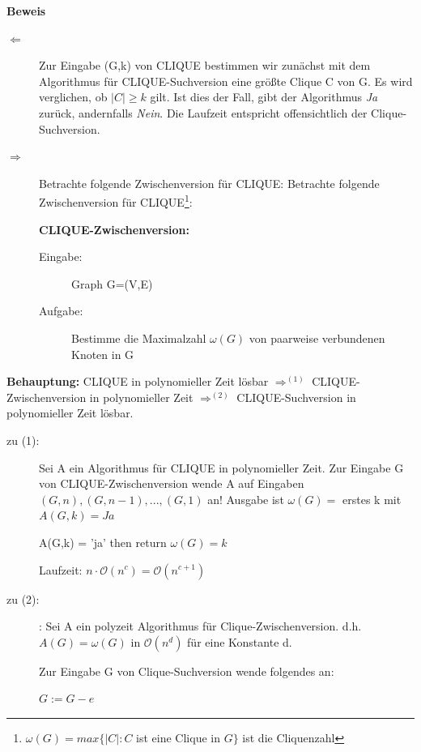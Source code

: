 \documentclass{article} %
\begin{document}
\textbf{Beweis}
\begin{description}
\item[$\Leftarrow$] Zur Eingabe (G,k) von CLIQUE  bestimmen wir zunächst mit dem Algorithmus für CLIQUE-Suchversion eine größte Clique C von G.
Es wird verglichen, ob $|C| \geq k$ gilt.
Ist dies der Fall, gibt der Algorithmus \emph{Ja} zurück, andernfalls \emph{Nein}.
Die Laufzeit entspricht offensichtlich der Clique-Suchversion.

\item[$\Rightarrow$] Betrachte folgende Zwischenversion für CLIQUE:
Betrachte folgende Zwischenversion für CLIQUE\footnote{$\omega(G) = max \{|C|: C$ ist eine Clique in $G\}$ ist die Cliquenzahl}:
\begin{framed}
\textbf{CLIQUE-Zwischenversion:}
\begin{description}
\item  [Eingabe:]Graph G=(V,E)
\item [Aufgabe:] Bestimme die Maximalzahl $\omega (G)$  von paarweise verbundenen Knoten in G
\end{description}
\end{framed}
\end{description}
\textbf{Behauptung:} CLIQUE in polynomieller Zeit lösbar $\Rightarrow^{(1)}$ CLIQUE-Zwischenversion in polynomieller Zeit $\Rightarrow^{(2)}$ CLIQUE-Suchversion in polynomieller Zeit lösbar.

\begin{description}
\item[zu (1):] Sei A ein Algorithmus für CLIQUE in polynomieller Zeit.
Zur Eingabe G von CLIQUE-Zwischenversion wende A auf Eingaben $(G,n), (G,n-1),...,(G,1)$ an!
Ausgabe ist $\omega (G) =$ erstes k mit $A(G,k) = Ja$

\begin{algorithmic}[1]
	\If A(G,k) = 'ja'
	then return $\omega (G) = k $
	\EndIf
\EndFor
\end{algorithmic}
Laufzeit: $n \cdot \mathcal{O}(n^c) = \mathcal{O}(n^{c+1})$


\item[zu (2):]: Sei A ein polyzeit Algorithmus für Clique-Zwischenversion.
d.h. $A(G) = \omega (G)$ in $\mathcal{O}(n^d)$ für eine Konstante d.

Zur Eingabe G von Clique-Suchversion wende folgendes an:
\begin{algorithmic}[1]
	 $G := G - e$
	\EndIf
\EndFor
\State {}
\end{algorithmic}
\end{description}
\end{document}

